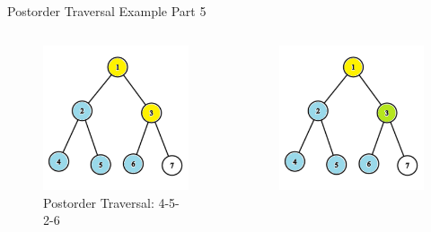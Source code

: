 \documentclass[aspectratio=169]{beamer}%
\begin{document}
\begin{frame}{Postorder Traversal Example Part 5}
    \begin{columns}
        \begin{column}{0.32\textwidth}
            \begin{figure}
                \centering
                \includegraphics[width = .9\linewidth]{tree-post 13.png}
                \caption{Postorder Traversal: 4-5-2-6}
            \end{figure}
        \end{column}
        \hfill
        \begin{column}{0.32\textwidth}
            \begin{figure}
                \centering
                \includegraphics[width = .9\linewidth]{tree-post 14.png}

\end{figure}
\end{column}
\end{columns}
\end{frame}
\end{document}

